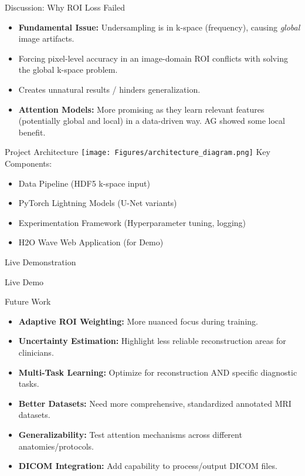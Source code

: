 \documentclass{beamer}
\begin{document}
\begin{frame}{Discussion: Why ROI Loss Failed}
  \begin{itemize}
    \item \textbf{Fundamental Issue:} Undersampling is in k-space (frequency), causing \textit{global} image artifacts.
    \item Forcing pixel-level accuracy in an image-domain ROI conflicts with solving the global k-space problem.
    \item Creates unnatural results / hinders generalization.
    \item \textbf{Attention Models:} More promising as they learn relevant features (potentially global and local) in a data-driven way. AG showed some local benefit.
  \end{itemize}
\end{frame}

\begin{frame}{Project Architecture}
  \centering
  \texttt{[image: Figures/architecture\_diagram.png]}
  \vfill
  Key Components:
  \begin{itemize}
      \item Data Pipeline (HDF5 k-space input)
      \item PyTorch Lightning Models (U-Net variants)
      \item Experimentation Framework (Hyperparameter tuning, logging)
      \item H2O Wave Web Application (for Demo)
  \end{itemize}
\end{frame}

\begin{frame}{Live Demonstration}
  \begin{center}
    \Huge Live Demo
  \end{center}
\end{frame}

\begin{frame}{Future Work}
  \begin{itemize}
    \item \textbf{Adaptive ROI Weighting:} More nuanced focus during training.
    \item \textbf{Uncertainty Estimation:} Highlight less reliable reconstruction areas for clinicians.
    \item \textbf{Multi-Task Learning:} Optimize for reconstruction AND specific diagnostic tasks.
    \item \textbf{Better Datasets:} Need more comprehensive, standardized annotated MRI datasets.
    \item \textbf{Generalizability:} Test attention mechanisms across different anatomies/protocols.
    \item \textbf{DICOM Integration:} Add capability to process/output DICOM files.
  \end{itemize}
\end{frame}
\end{document}
